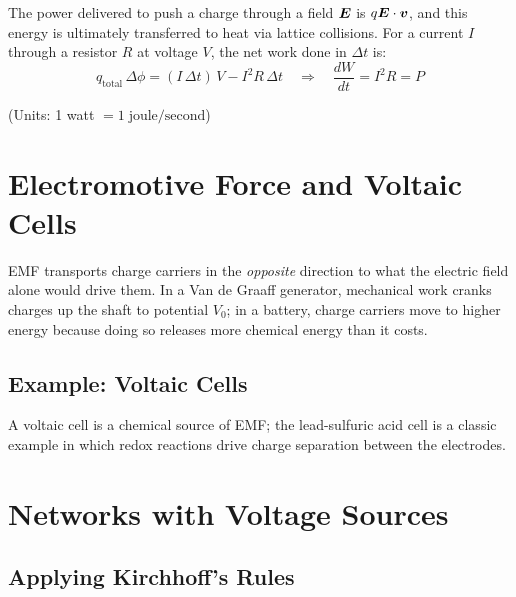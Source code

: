 The power delivered to push a charge through a field $\vect{E}$ is $q\vect{E}\cdot\lvect{v}$, and this energy is ultimately transferred to heat via lattice collisions. For a current $I$ through a resistor $R$ at voltage $V$, the net work done in $\Delta t$ is:
\[
    q_\text{total}\,\Delta\phi = (I\,\Delta t)\,V - I^2 R\,\Delta t
    \quad\Rightarrow\quad \boxed{\frac{dW}{dt} = I^2 R = P}
\]

(Units: 1 watt $= 1\;\text{joule/second}$)

\section{Electromotive Force and Voltaic Cells}

EMF transports charge carriers in the \emph{opposite} direction to what the electric field alone would drive them. In a Van de Graaff generator, mechanical work cranks charges up the shaft to potential $V_0$; in a battery, charge carriers move to higher energy because doing so releases more chemical energy than it costs.

\subsection{Example: Voltaic Cells}

A voltaic cell is a chemical source of EMF; the lead-sulfuric acid cell is a classic example in which redox reactions drive charge separation between the electrodes.

\section{Networks with Voltage Sources}

\subsection{Applying Kirchhoff's Rules}

